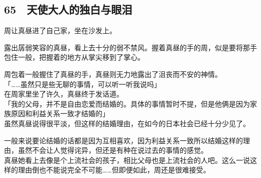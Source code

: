 \subsection{65　天使大人的独白与眼泪}

周让真昼进了自己家，坐在沙发上。

露出孱弱笑容的真昼，看上去十分的弱不禁风。握着真昼的手的周，似是要将那手包住一般，把握着的地方从掌尖移到了掌心。

周包着一般握住了真昼的手，真昼则无力地露出了沮丧而不安的神情。\\

「……虽然只是些无聊的事情，可以听一听我说吗」\\

在周家里坐了许久，真昼终于发话道。\\

「我的父母，并不是自由恋爱而结婚的。具体的事情暂时不提，但是他俩是因为家族原因和利益关系一致才结婚的」\\

虽然真昼说得很平淡，但这样的结婚理由，在如今的日本社会已经十分少见了。

一般来说要论结婚的话都是因为互相喜欢，因为利益关系一致所以结婚这样的理由，虽然不会让人觉得诧异，但还是有种在说过去的事情的感觉。\\

真昼她看上去像是个上流社会的孩子，相比父母也是上流社会的人吧。这么一说这样的理由倒也不能说完全不可能……但即便如此，周还是很难接受。\\

